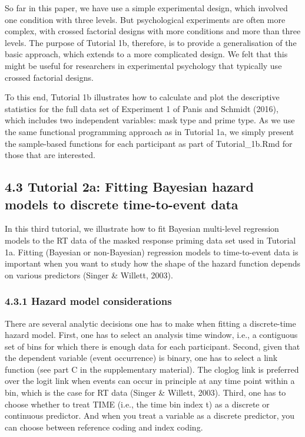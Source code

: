 \documentclass[
  man, donotrepeattitle,floatsintext]{apa6}
\begin{document}
So far in this paper, we have use a simple experimental design, which involved one condition with three levels. But psychological experiments are often more complex, with crossed factorial designs with more conditions and more than three levels. The purpose of Tutorial 1b, therefore, is to provide a generalisation of the basic approach, which extends to a more complicated design. We felt that this might be useful for researchers in experimental psychology that typically use crossed factorial designs.

To this end, Tutorial 1b illustrates how to calculate and plot the descriptive statistics for the full data set of Experiment 1 of Panis and Schmidt (2016), which includes two independent variables: mask type and prime type. As we use the same functional programming approach as in Tutorial 1a, we simply present the sample-based functions for each participant as part of Tutorial\_1b.Rmd for those that are interested.

\subsection{4.3 Tutorial 2a: Fitting Bayesian hazard models to discrete time-to-event data}\label{tutorial-2a-fitting-bayesian-hazard-models-to-discrete-time-to-event-data}

In this third tutorial, we illustrate how to fit Bayesian multi-level regression models to the RT data of the masked response priming data set used in Tutorial 1a. Fitting (Bayesian or non-Bayesian) regression models to time-to-event data is important when you want to study how the shape of the hazard function depends on various predictors (Singer \& Willett, 2003).

\subsubsection{4.3.1 Hazard model considerations}\label{hazard-model-considerations}

There are several analytic decisions one has to make when fitting a discrete-time hazard model. First, one has to select an analysis time window, i.e., a contiguous set of bins for which there is enough data for each participant. Second, given that the dependent variable (event occurrence) is binary, one has to select a link function (see part C in the supplementary material). The cloglog link is preferred over the logit link when events can occur in principle at any time point within a bin, which is the case for RT data (Singer \& Willett, 2003). Third, one has to choose whether to treat TIME (i.e., the time bin index t) as a discrete or continuous predictor. And when you treat a variable as a discrete predictor, you can choose between reference coding and index coding.
\end{document}
